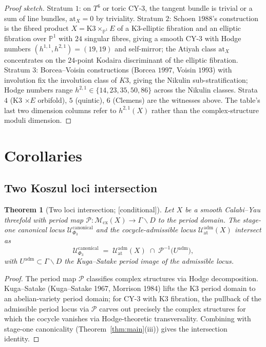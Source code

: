 \documentclass[11pt,reqno]{amsart}
\theoremstyle{plain}
\newtheorem{theorem}{Theorem}[section]
\theoremstyle{definition}
\theoremstyle{remark}
\providecommand{\ClaimStatusConditional}{\textnormal{[conditional]}}
\newcommand{\Pbb}{\mathbb{P}}
\newcommand{\cM}{\mathcal{M}}
\newcommand{\cU}{\mathcal{U}}
\newcommand{\cP}{\mathcal{P}}
\newcommand{\at}{\mathrm{at}}
\begin{document}
\begin{proof}[Proof sketch]
Stratum $1$: on $T^6$ or toric CY-$3$, the tangent bundle is trivial or a sum of line bundles, $\at_X = 0$ by triviality. Stratum $2$: Schoen $1988$'s construction is the fibred product $X = \mathrm{K3} \times_{\Pbb^1} E$ of a K3-elliptic fibration and an elliptic fibration over $\Pbb^1$ with $24$ singular fibres, giving a smooth CY-$3$ with Hodge numbers $(h^{1,1}, h^{2,1}) = (19, 19)$ and self-mirror; the Atiyah class $\at_X$ concentrates on the $24$-point Kodaira discriminant of the elliptic fibration. Stratum $3$: Borcea--Voisin constructions (Borcea $1997$, Voisin $1993$) with involution fix the involution class of $K3$, giving the Nikulin sub-stratification; Hodge numbers range $h^{2,1} \in \{14, 23, 35, 50, 86\}$ across the Nikulin classes. Strata $4$ (K3 $\times E$ orbifold), $5$ (quintic), $6$ (Clemens) are the witnesses above. The table's last two dimension columns refer to $h^{2,1}(X)$ rather than the complex-structure moduli dimension.
\end{proof}

\section{Corollaries}
\label{sec:corollaries}

\subsection{Two Koszul loci intersection}

\begin{theorem}[Two loci intersection; \ClaimStatusConditional]
\label{thm:two-loci}
Let $X$ be a smooth Calabi--Yau threefold with period map $\cP : \cM_{\mathrm{cx}}(X) \to \Gamma \backslash D$ to the period domain. The stage-one canonical locus $\cU^{\mathrm{canonical}}_{\Phi_3}$ and the cocycle-admissible locus $\cU^{\mathrm{adm}}_{\at}(X)$ intersect as
\[
  \cU^{\mathrm{canonical}}_{\Phi_3} \;=\; \cU^{\mathrm{adm}}_{\at}(X) \;\cap\; \cP^{-1}\bigl(U^{\mathrm{adm}}\bigr),
\]
with $U^{\mathrm{adm}} \subset \Gamma \backslash D$ the Kuga--Satake period image of the admissible locus.
\end{theorem}

\begin{proof}
The period map $\cP$ classifies complex structures via Hodge decomposition. Kuga--Satake (Kuga--Satake 1967, Morrison 1984) lifts the K3 period domain to an abelian-variety period domain; for CY-$3$ with K3 fibration, the pullback of the admissible period locus via $\cP$ carves out precisely the complex structures for which the cocycle vanishes via Hodge-theoretic transversality. Combining with stage-one canonicality (Theorem~\ref{thm:main}(iii)) gives the intersection identity.
\end{proof}
\end{document}
